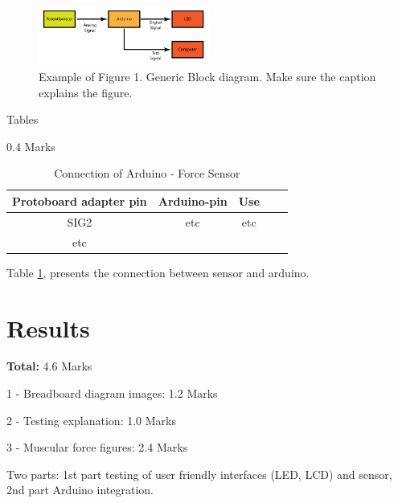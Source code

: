 \documentclass[journal]{IEEEtran}
\begin{document}
\begin{figure}[H]%
\begin {center}
\includegraphics[width=0.5\textwidth]{images/arduino_block_diagram.png}
\caption{Example of Figure 1. Generic Block diagram. Make sure the caption explains the figure.}
\label{fig:block_diag}
\end {center}
\end{figure}

Tables
\begin{flushright} 0.4 Marks \end{flushright}

\begin{table}[!ht] %
\centering
\caption{Connection of Arduino - Force Sensor}
\begin{tabular}{ccccc}
Protoboard adapter pin& Arduino-pin & Use \\ \hline
SIG2   & etc                    & etc          \\

etc &             &      

\end{tabular}
\label{table:connection_diag}
\end{table}

Table \ref{table:connection_diag}, presents the connection between sensor and arduino. 

\section{Results}
\begin{flushright} {\bf Total: } 4.6 Marks \end{flushright}
\begin{flushright} 1 - Breadboard diagram images: 1.2 Marks \end{flushright}
\begin{flushright} 2 - Testing explanation: 1.0 Marks \end{flushright}
\begin{flushright} 3 - Muscular force figures: 2.4 Marks \end{flushright}

Two parts: 1st part testing of user friendly interfaces (LED, LCD) and sensor, 2nd part Arduino integration. \\[0.1in]
\end{document}
